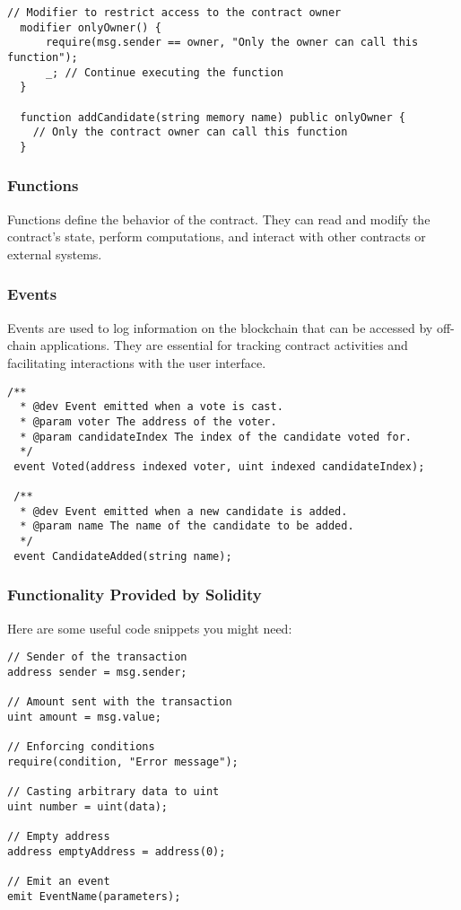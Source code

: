 \documentclass[12pt]{article}
\begin{document}
\begin{lstlisting}[language=Solidity]
  // Modifier to restrict access to the contract owner
  modifier onlyOwner() {
      require(msg.sender == owner, "Only the owner can call this function");
      _; // Continue executing the function
  }

  function addCandidate(string memory name) public onlyOwner {
    // Only the contract owner can call this function
  }
\end{lstlisting}

\subsubsection*{Functions}

Functions define the behavior of the contract. They can read and modify the contract's state, perform computations, and interact with other contracts or external systems.

\subsubsection*{Events}

Events are used to log information on the blockchain that can be accessed by off-chain applications. They are essential for tracking contract activities and facilitating interactions with the user interface.

\begin{lstlisting}[language=Solidity]
  /**
  * @dev Event emitted when a vote is cast.
  * @param voter The address of the voter.
  * @param candidateIndex The index of the candidate voted for.
  */
 event Voted(address indexed voter, uint indexed candidateIndex);

 /**
  * @dev Event emitted when a new candidate is added.
  * @param name The name of the candidate to be added.
  */
 event CandidateAdded(string name);
\end{lstlisting}

\subsubsection*{Functionality Provided by Solidity}
Here are some useful code snippets you might need:

\begin{lstlisting}[language=Solidity]
// Sender of the transaction
address sender = msg.sender;

// Amount sent with the transaction
uint amount = msg.value;

// Enforcing conditions
require(condition, "Error message");

// Casting arbitrary data to uint
uint number = uint(data);

// Empty address
address emptyAddress = address(0);

// Emit an event
emit EventName(parameters);
\end{lstlisting}
\end{document}
